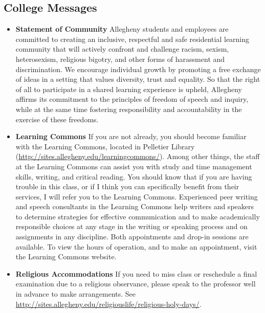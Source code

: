 \documentclass[11pt]{article} %
\begin{document}
\subsection*{College Messages}
\begin{itemize}

\item \textbf{Statement of Community}
Allegheny students and employees are committed to creating an inclusive, respectful and safe residential learning community that will actively confront and challenge racism, sexism, heterosexism, religious bigotry, and other forms of harassment and discrimination. We encourage individual growth by promoting a free exchange of ideas in a setting that values diversity, trust and equality. So that the right of all to participate in a shared learning experience is upheld, Allegheny affirms its commitment to the principles of freedom of speech and inquiry, while at the same time fostering responsibility and accountability in the exercise of these freedoms.






\item \textbf{Learning Commons}
If you are not already, you should become familiar with the Learning Commons, located in Pelletier Library (\url{http://sites.allegheny.edu/learningcommons/}). Among other things, the staff at the Learning Commons can assist you with study and time management skills, writing, and critical reading. You should know that if you are having trouble in this class, or if I think you can specifically benefit from their services, I will refer you to the Learning Commons. Experienced peer writing and speech consultants in the Learning Commons help writers and speakers to determine strategies for effective communication and to make academically responsible choices at any stage in the writing or speaking process and on assignments in any discipline. Both appointments and drop-in sessions are available. To view the hours of operation, and to make an appointment, visit the Learning Commons website.

\item \textbf{Religious Accommodations}
If you need to miss class or reschedule a final examination due to a religious observance, please speak to the professor well in advance to make arrangements. See \url{http://sites.allegheny.edu/religiouslife/religious-holy-days/}.
\end{itemize}
\end{document}
